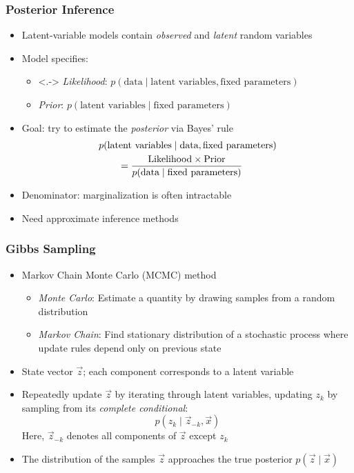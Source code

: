 
\begin{frame}
\frametitle{Posterior Inference}
\begin{itemize}[<+->]
\item Latent-variable models contain \emph{observed} and \emph{latent} random variables
\item Model specifies:
    \begin{itemize}
    \item<.-> \emph{Likelihood}: $p(\text{data} \mid \text{latent variables}, \text{fixed parameters})$
    \item<+-> \emph{Prior}: $p(\text{latent variables} \mid \text{fixed parameters})$
    \end{itemize}
\item Goal: try to estimate the \emph{posterior} via Bayes' rule
\begin{align*}
\MoveEqLeft
p(\text{latent variables} \mid \text{data}, \text{fixed parameters}) \\
&=
\frac{\text{Likelihood} \times \text{Prior}}
     {p(\text{data} \mid \text{fixed parameters})}
\end{align*}
\item Denominator: marginalization is often intractable
\item Need approximate inference methods
\end{itemize}
\end{frame}

\begin{frame}
\frametitle{Gibbs Sampling}
\begin{itemize}[<+->]
\item Markov Chain Monte Carlo (MCMC) method
    \begin{itemize}[<+->]
    \item \emph{Monte Carlo}: Estimate a quantity by drawing samples from a random distribution
    \item \emph{Markov Chain}: Find stationary distribution of a stochastic process where update rules depend only on previous state
    \end{itemize}
\item State vector $\vec z$; each component corresponds to a latent variable
\item Repeatedly update $\vec z$ by iterating through latent variables, updating $z_k$ by sampling from its \emph{complete conditional}:
\[ p(z_k \mid \vec z_{-k}, \vec x) \]
Here, $\vec z_{-k}$ denotes all components of $\vec z$ except $z_k$
\item The distribution of the samples $\vec z$ approaches the true posterior $p(\vec z \mid \vec x)$
\end{itemize}
\end{frame}

